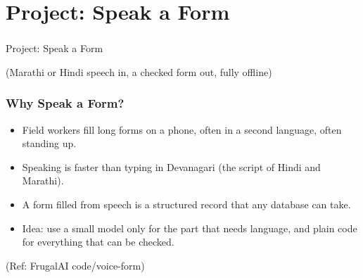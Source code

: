 
\section[Voice Form]{Project: Speak a Form}

\begin{frame}[fragile]\frametitle{}
\begin{center}
{\Large Project: Speak a Form}

\medskip
{\small (Marathi or Hindi speech in, a checked form out, fully offline)}
\end{center}
\end{frame}

\begin{frame}[fragile]\frametitle{Why Speak a Form?}
\begin{itemize}
\item Field workers fill long forms on a phone, often in a second language, often standing up.
\item Speaking is faster than typing in Devanagari (the script of Hindi and Marathi).
\item A form filled from speech is a structured record that any database can take.
\item Idea: use a small model only for the part that needs language, and plain code for everything that can be checked.
\end{itemize}
{\tiny (Ref: FrugalAI code/voice-form)}
\end{frame}


